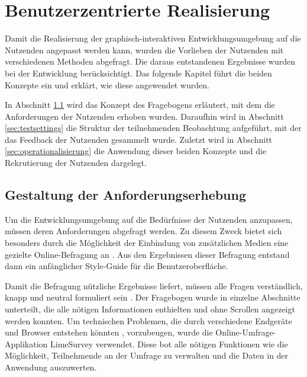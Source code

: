 \chapter{Benutzerzentrierte Realisierung}\label{ch:benutzerzentrierte-realisierung} %
Damit die Realisierung der graphisch-interaktiven Entwicklungsumgebung auf die Nutzenden angepasst werden kann, wurden die Vorlieben der Nutzenden mit verschiedenen Methoden abgefragt. Die daraus entstandenen Ergebnisse wurden bei der Entwicklung berücksichtigt. Das folgende Kapitel führt die beiden Konzepte ein und erklärt, wie diese angewendet wurden.

In Abschnitt \ref{sec:anforderungserhebung} wird das Konzept des Fragebogens erläutert, mit dem die Anforderungen der Nutzenden erhoben wurden. Daraufhin wird in Abschnitt \ref{sec:testsettings} die Struktur der teilnehmenden Beobachtung aufgeführt, mit der das Feedback der Nutzenden gesammelt wurde. Zuletzt wird in Abschnitt \ref{sec:operationalisierung} die Anwendung dieser beiden Konzepte und die Rekrutierung der Nutzenden dargelegt.

\section{Gestaltung der Anforderungserhebung}\label{sec:anforderungserhebung}

Um die Entwicklungsumgebung auf die Bedürfnisse der Nutzenden anzupassen, müssen deren Anforderungen abgefragt werden. Zu diesem Zweck bietet sich besonders durch die Möglichkeit der Einbindung von zusätzlichen Medien eine gezielte Online-Befragung an \cite{Schnell2018MethodenES}. Aus den Ergebnissen dieser Befragung entstand dann ein anfänglicher Style-Guide für die Benutzeroberfläche.

Damit die Befragung nützliche Ergebnisse liefert, müssen alle Fragen verständlich, knapp und neutral formuliert sein \cite{Jacobsen2019PraxisbuchUuU}. Der Fragebogen wurde in einzelne Abschnitte unterteilt, die alle nötigen Informationen enthielten und ohne Scrollen angezeigt werden konnten. Um technischen Problemen, die durch verschiedene Endgeräte und Browser entstehen könnten \cite{Schnell2018MethodenES}, vorzubeugen, wurde die Online-Umfrage-Applikation LimeSurvey verwendet. Diese bot alle nötigen Funktionen wie die Möglichkeit, Teilnehmende an der Umfrage zu verwalten und die Daten in der Anwendung auszuwerten. %


